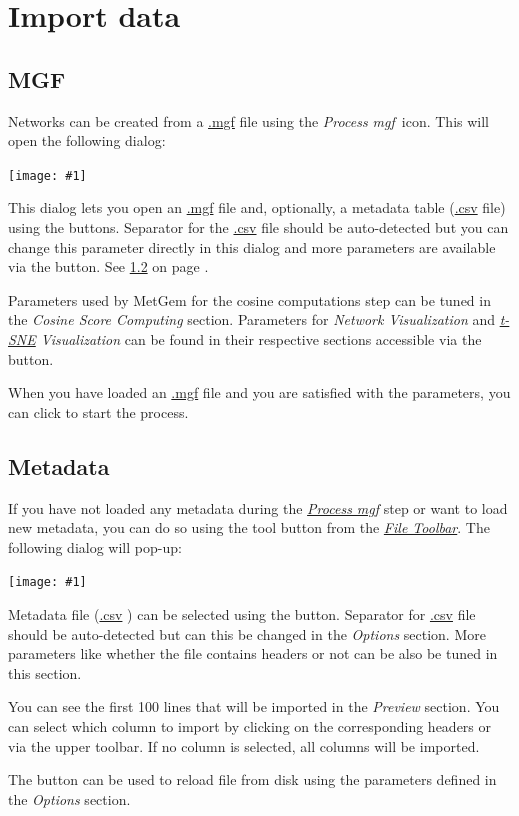 \documentclass[12pt,a4paper,titlepage,dvipsnames]{article}
\newcommand*{\appname}{MetGem }
\newcommand*{\tsne}{{\em\href{https://en.wikipedia.org/wiki/T-distributed_stochastic_neighbor_embedding}{t-SNE}} }
\newcommand*{\mgf}{\href{http://www.matrixscience.com/help/data_file_help.html}{.mgf} }
\newcommand*{\csv}{\href{https://en.wikipedia.org/wiki/Comma-separated_values}{.csv} }
\newcommand*{\img}[1]{%
    \raisebox{-.3\baselineskip}{%
        \texttt{[image: \#1]}%
    }%
}
\newcommand*{\winfig}[1]{%
	\begin{center}
		\texttt{[image: \#1]}
	\end{center}
}
\begin{document}
\section{Import data}
\subsection{MGF}
\label{import-mgf}
Networks can be created from a \mgf file using the \emph{\img{process-mgf}Process mgf}~icon. This will open the following dialog:
\winfig{process-mgf-dialog}

This dialog lets you open an \mgf file and, optionally, a metadata table (\csv file) using the \img{browse} buttons. Separator for the \csv file should be auto-detected but you can change this parameter directly in this dialog and more parameters are available via the \img{options} button. See \ref{import-metadata} on page \pageref{import-metadata}.

Parameters used by \appname for the cosine computations step can be tuned  in the \emph{Cosine Score Computing} section.
Parameters for \emph{Network Visualization} and \emph{\tsne Visualization} can be found in their respective sections accessible via the \img{more} button.

When you have loaded an \mgf file and you are satisfied with the parameters, you can click \img{ok} to start the process.

\subsection{Metadata}
\label{import-metadata}
If you have not loaded any metadata during the \hyperref[import-mgf]{\emph{Process mgf}} step or want to load new metadata, you can do so using the \img{import-metadata} tool button from the \hyperref[toolbars]{\emph{File Toolbar}}.
The following dialog will pop-up:
\winfig{import-metadata-dialog}

Metadata file (\csv) can be selected using the \img{browse} button. Separator for \csv file should be auto-detected but can this be changed in the \emph{Options} section. More parameters like whether the file contains headers or not can be also be tuned in this section.

You can see the first 100 lines that will be imported in the \emph{Preview} section. You can select which column to import by clicking on the corresponding headers or via the upper toolbar. If no column is selected, all columns will be imported.

The \img{refresh} button can be used to reload file from disk using the parameters defined in the \emph{Options} section.
\end{document}
